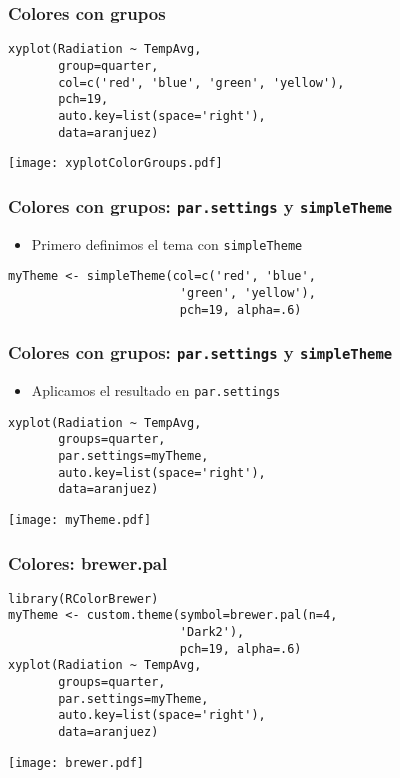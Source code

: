 \documentclass[xcolor={usenames,svgnames,dvipsnames}]{beamer}
\begin{document}
\begin{frame}[fragile]
\frametitle{Colores con grupos}
\label{sec-2-1-11}


\lstset{language=R}
\begin{lstlisting}
xyplot(Radiation ~ TempAvg,
       group=quarter,
       col=c('red', 'blue', 'green', 'yellow'),
       pch=19,
       auto.key=list(space='right'),
       data=aranjuez)
\end{lstlisting}

\texttt{[image: xyplotColorGroups.pdf]}
\end{frame}
\begin{frame}[fragile]
\frametitle{Colores con grupos: \texttt{par.settings} y \texttt{simpleTheme}}
\label{sec-2-1-12}

\begin{itemize}
\item Primero definimos el tema con \texttt{simpleTheme}
\end{itemize}

\lstset{language=R}
\begin{lstlisting}
myTheme <- simpleTheme(col=c('red', 'blue',
                        'green', 'yellow'),
                        pch=19, alpha=.6)
\end{lstlisting}
\end{frame}
\begin{frame}[fragile]
\frametitle{Colores con grupos: \texttt{par.settings} y \texttt{simpleTheme}}
\label{sec-2-1-13}

\begin{itemize}
\item Aplicamos el resultado en \texttt{par.settings}
\end{itemize}

\lstset{language=R}
\begin{lstlisting}
xyplot(Radiation ~ TempAvg,
       groups=quarter,
       par.settings=myTheme,
       auto.key=list(space='right'),
       data=aranjuez)
\end{lstlisting}

\texttt{[image: myTheme.pdf]}
\end{frame}
\begin{frame}[fragile]
\frametitle{Colores: brewer.pal}
\label{sec-2-1-14}


\lstset{language=R}
\begin{lstlisting}
library(RColorBrewer)
myTheme <- custom.theme(symbol=brewer.pal(n=4,
                        'Dark2'),
                        pch=19, alpha=.6)
xyplot(Radiation ~ TempAvg,
       groups=quarter,
       par.settings=myTheme,
       auto.key=list(space='right'),
       data=aranjuez)
\end{lstlisting}

\texttt{[image: brewer.pdf]}
\end{frame}
\end{document}

